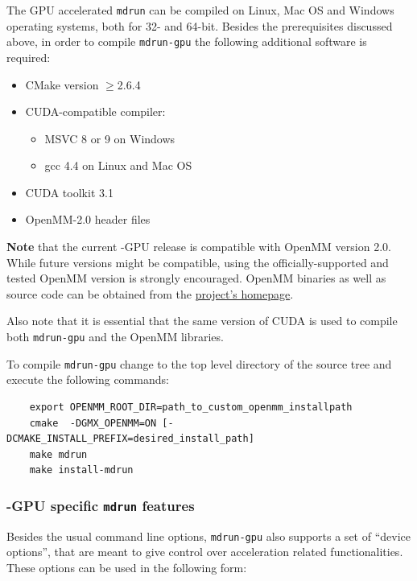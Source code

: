 The GPU accelerated {\tt mdrun} can be compiled on Linux, Mac OS and Windows 
operating systems, both for 32- and 64-bit. Besides the prerequisites 
discussed above, in order to compile {\tt mdrun-gpu} the following additional 
software is required: 
\begin{itemize}
    \item CMake version $\geq$2.6.4
    \item CUDA-compatible compiler: 
        \begin{itemize}
            \item MSVC 8 or 9 on Windows 
            \item gcc 4.4 on Linux and Mac OS
        \end{itemize}
    \item CUDA toolkit 3.1
    \item OpenMM-2.0 header files
\end{itemize}
{\bf Note} that the current {\gromacs}-GPU release is compatible with OpenMM  
version 2.0. While future versions might be compatible, using the officially-supported 
and tested OpenMM version is strongly encouraged.
OpenMM binaries as well as source code can be obtained from the 
\href{https://simtk.org/project/xml/downloads.xml?group_id=161}{project's homepage}.

Also note that it is essential that the same version of CUDA is used to compile both
{\tt mdrun-gpu} and the OpenMM libraries. 

To compile {\tt mdrun-gpu} change to the top level directory of the source 
tree and execute the following commands: 

{\small
\begin{verbatim}
    export OPENMM_ROOT_DIR=path_to_custom_openmm_installpath
    cmake  -DGMX_OPENMM=ON [-DCMAKE_INSTALL_PREFIX=desired_install_path]
    make mdrun
    make install-mdrun
\end{verbatim}}



\subsubsection{{\gromacs}-GPU specific {\tt mdrun} features}

Besides the usual command line options, 
{\tt mdrun-gpu} also supports a set of ``device options'', that are meant to 
give control over acceleration related functionalities. 
These options can be used in the following form:

